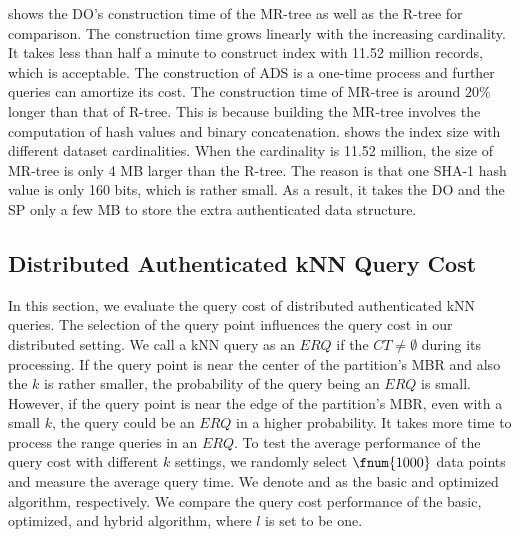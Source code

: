  shows the DO's construction time of the MR-tree as well as the R-tree for comparison. The construction time grows linearly with the increasing cardinality. It takes less than half a minute to construct index with 11.52 million records, which is acceptable. The construction of ADS is a one-time process and further queries can amortize its cost. The construction time of MR-tree is around $20\%$ longer than that of R-tree. This is because building the MR-tree involves the computation of hash values and binary concatenation.  shows the index size with different dataset cardinalities. When the cardinality is 11.52 million, the size of MR-tree is only 4 MB larger than the R-tree. The reason is that one SHA-1 hash value is only 160 bits, which is rather small. As a result, it takes the DO and the SP only a few MB to store the extra authenticated data structure.

\subsection{Distributed Authenticated kNN Query Cost}

In this section, we evaluate the query cost of distributed authenticated kNN queries. The selection of the query point influences the query cost in our distributed setting. We call a kNN query as an $ERQ$ if the $CT\neq\emptyset$ during its processing. If the query point is near the center of the partition's MBR and also the $k$ is rather smaller, the probability of the query being an $ERQ$ is small. However, if the query point is near the edge of the partition's MBR, even with a small $k$, the query could be an $ERQ$ in a higher probability. It takes more time to process the range queries in an $ERQ$. To test the average performance of the query cost with different $k$ settings, we randomly select $\fnum{1000}$ data points and measure the average query time. We denote  and  as the basic and optimized algorithm, respectively. We compare the query cost performance of the basic, optimized, and hybrid algorithm, where $l$ is set to be one.

